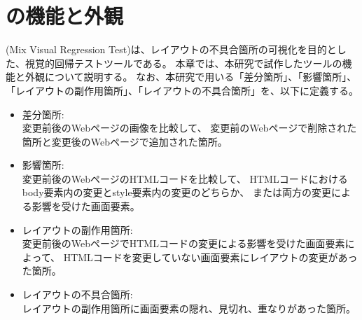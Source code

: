 \chapter{ \toolName の機能と外観}\label{cha:Function}
\toolName (Mix Visual Regression Test)は、レイアウトの不具合箇所の可視化を目的とした、視覚的回帰テストツールである。
本章では、本研究で試作したツール\toolName の機能と外観について説明する。
なお、本研究で用いる「差分箇所」、「影響箇所」、「レイアウトの副作用箇所」、「レイアウトの不具合箇所」を、以下に定義する。
\begin{itemize}
    \item 差分箇所:\\
          変更前後のWebページの画像を比較して、
          変更前のWebページで削除された箇所と変更後のWebページで追加された箇所。
    \item 影響箇所:\\
          変更前後のWebページのHTMLコードを比較して、
          HTMLコードにおけるbody要素内の変更とstyle要素内の変更のどちらか、
          または両方の変更による影響を受けた画面要素。
    \item レイアウトの副作用箇所:\\
          変更前後のWebページでHTMLコードの変更による影響を受けた画面要素によって、
          HTMLコードを変更していない画面要素にレイアウトの変更があった箇所。
    \item レイアウトの不具合箇所:\\
          レイアウトの副作用箇所に画面要素の隠れ、見切れ、重なりがあった箇所。
\end{itemize}

